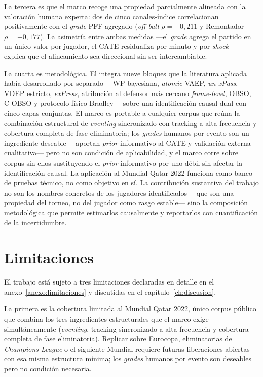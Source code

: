 La tercera es que el marco recoge una propiedad parcialmente alineada
con la valoración humana experta: dos de cinco canales-índice
correlacionan positivamente con el \textit{grade} PFF agregado
(\textit{off-ball} $\rho = +0{,}211$ y Remontador $\rho = +0{,}177$).
La asimetría entre ambas medidas ---el \textit{grade} agrega el
partido en un único valor por jugador, el CATE residualiza por
minuto y por \textit{shock}--- explica que el alineamiento sea
direccional sin ser intercambiable.

La cuarta es metodológica. El \CCV{} integra nueve bloques que la
literatura aplicada había desarrollado por separado ---WP bayesiana,
\textit{atomic}-VAEP, \textit{un-xPass}, VDEP estricto,
\textit{exPress}, atribución al defensor más cercano
\textit{frame-level}, OBSO, C-OBSO y protocolo físico Bradley---
sobre una identificación causal dual con cinco capas conjuntas. El marco es portable a cualquier corpus que reúna
la combinación estructural de \textit{eventing} sincronizado con
tracking a alta frecuencia y cobertura completa de fase eliminatoria;
los \textit{grades} humanos por evento son un ingrediente deseable
---aportan \textit{prior} informativo al CATE y validación externa
cualitativa--- pero no son condición de aplicabilidad, y el marco
corre sobre corpus sin ellos sustituyendo el \textit{prior} informativo
por uno débil sin afectar la identificación causal. La aplicación al
Mundial Qatar 2022 funciona como banco de pruebas técnico, no como
objetivo en sí. La
contribución sustantiva del trabajo no son los nombres concretos de
los jugadores identificados ---que son una propiedad del torneo,
no del jugador como rasgo estable--- sino la composición metodológica
que permite estimarlos causalmente y reportarlos con cuantificación
de la incertidumbre.


\section{Limitaciones}
\label{sec:limitaciones}

El trabajo está sujeto a tres limitaciones declaradas en detalle en
el anexo~\ref{anexo:limitaciones} y discutidas en el
capítulo~\ref{ch:discusion}.

La primera es la cobertura limitada al Mundial Qatar 2022, único
corpus público que combina los tres ingredientes estructurales que
el marco exige simultáneamente (\textit{eventing}, tracking sincronizado
a alta frecuencia y cobertura completa de fase eliminatoria). Replicar
sobre Eurocopa, eliminatorias de \textit{Champions League} o el
siguiente Mundial requiere futuras liberaciones abiertas con esa misma
estructura mínima; los \textit{grades} humanos por evento son
deseables pero no condición necesaria.


